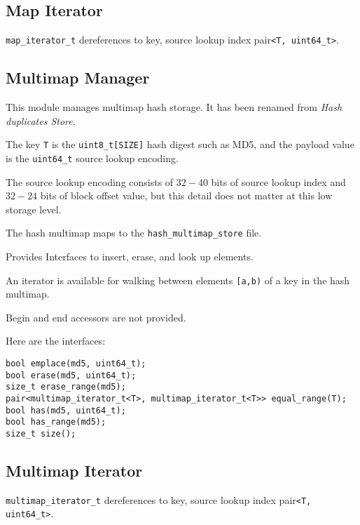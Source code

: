 \documentclass[12pt,twoside]{article}
\begin{document}
\subsection{Map Iterator}
\texttt{map\_iterator\_t} dereferences to
key, source lookup index pair\texttt{<T, uint64\_t>}.

\subsection{Multimap Manager}
This module manages multimap hash storage.
It has been renamed from \textit{Hash duplicates Store}.
\begin{compactitem}
\item The key \texttt{T} is the \texttt{uint8\_t[SIZE]} hash digest such as MD5,
and the payload value is the \texttt{uint64\_t} source lookup encoding.
\item The source lookup encoding consists of $32-40$ bits
of source lookup index and $32-24$ bits of block offset value,
but this detail does not matter at this low storage level.
\item The hash multimap maps to the \texttt{hash\_multimap\_store} file.
\item Provides Interfaces to insert, erase, and look up elements.
\item An iterator is available for walking
between elements \texttt{[a,b)} of a key in the hash multimap.
\item Begin and end accessors are not provided.
\end{compactitem}

Here are the interfaces:
\begin{small}
\begin{verbatim}
bool emplace(md5, uint64_t);
bool erase(md5, uint64_t);
size_t erase_range(md5);
pair<multimap_iterator_t<T>, multimap_iterator_t<T>> equal_range(T);
bool has(md5, uint64_t);
bool has_range(md5);
size_t size();
\end{verbatim}
\end{small}

\subsection{Multimap Iterator}
\texttt{multimap\_iterator\_t} dereferences to
key, source lookup index pair\texttt{<T, uint64\_t>}.

\end{document}
